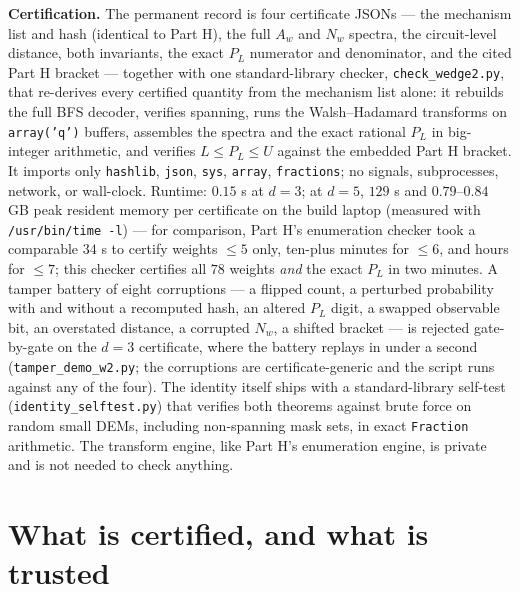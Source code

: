 \documentclass[11pt]{amsart}
\newcommand{\PL}{P_{L}}
\theoremstyle{plain}
\theoremstyle{definition}
\theoremstyle{remark}
\begin{document}
\textbf{Certification.} The permanent record is four certificate JSONs ---
the mechanism list and hash (identical to Part H), the full $A_w$ and $N_w$
spectra, the circuit-level distance, both invariants, the exact $\PL$
numerator and denominator, and the cited Part H bracket --- together with
one standard-library checker, \texttt{check\_wedge2.py}, that re-derives
every certified quantity from the mechanism list alone: it rebuilds the full
BFS decoder, verifies spanning, runs the Walsh--Hadamard transforms on
\texttt{array('q')} buffers, assembles the spectra and the exact rational
$\PL$ in big-integer arithmetic, and verifies $L \le \PL \le U$ against the
embedded Part H bracket. It imports only \texttt{hashlib}, \texttt{json},
\texttt{sys}, \texttt{array}, \texttt{fractions}; no signals, subprocesses,
network, or wall-clock. Runtime: $0.15$ s at $d=3$; at $d=5$, $129$ s and
$0.79$--$0.84$ GB peak resident memory per certificate on the build laptop
(measured with \texttt{/usr/bin/time -l}) --- for comparison, Part H's
enumeration checker took a comparable $34$ s to certify weights ${\le}5$
only, ten-plus minutes for ${\le}6$, and hours for ${\le}7$; this checker
certifies all $78$ weights \emph{and} the exact $\PL$ in two minutes. A
tamper battery of eight corruptions --- a flipped count, a perturbed
probability with and without a recomputed hash, an altered $\PL$ digit, a
swapped observable bit, an overstated distance, a corrupted $N_w$, a shifted
bracket --- is rejected gate-by-gate on the $d{=}3$ certificate, where the
battery replays in under a second (\texttt{tamper\_demo\_w2.py}; the
corruptions are certificate-generic and the script runs against any of the
four). The
identity itself ships with a standard-library self-test
(\texttt{identity\_selftest.py}) that verifies both theorems against brute
force on random small DEMs, including non-spanning mask sets, in exact
\texttt{Fraction} arithmetic. The transform engine, like Part H's
enumeration engine, is private and is not needed to check anything.

\section{What is certified, and what is trusted}\label{sec:trust}
\end{document}
